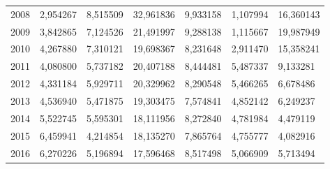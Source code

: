 \begin{table}
\begin{tabular}{p{1cm}p{2cm}p{2cm}p{2cm}p{2cm}p{2cm}p{2cm}}
 2008 &                                 2,954267 &                            8,515509 &                       32,961836 &                                     9,933158 &                                           1,107994 &               16,360143 \\
 2009 &                                 3,842865 &                            7,124526 &                       21,491997 &                                     9,288138 &                                           1,115667 &               19,987949 \\
 2010 &                                 4,267880 &                            7,310121 &                       19,698367 &                                     8,231648 &                                           2,911470 &               15,358241 \\
 2011 &                                 4,080800 &                            5,737182 &                       20,407188 &                                     8,444481 &                                           5,487337 &                9,133281 \\
 2012 &                                 4,331184 &                            5,929711 &                       20,329962 &                                     8,290548 &                                           5,466265 &                6,678486 \\
 2013 &                                 4,536940 &                            5,471875 &                       19,303475 &                                     7,574841 &                                           4,852142 &                6,249237 \\
 2014 &                                 5,522745 &                            5,595301 &                       18,111956 &                                     8,272840 &                                           4,781984 &                4,479119 \\
 2015 &                                 6,459941 &                            4,214854 &                       18,135270 &                                     7,865764 &                                           4,755777 &                4,082916 \\
 2016 &                                 6,270226 &                            5,196894 &                       17,596468 &                                     8,517498 &                                           5,066909 &                5,713494 \\
\bottomrule
\end{tabular}
\end{table}
